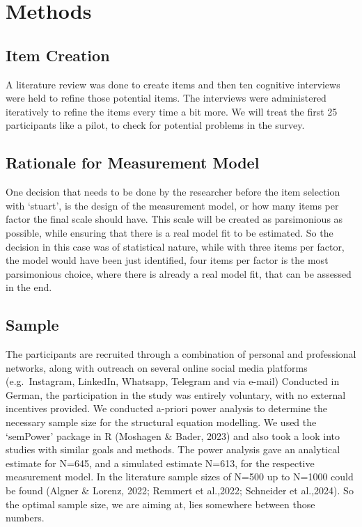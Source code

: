 \documentclass[
  12pt,
  a4paper,
  twoside]{article}
\begin{document}
\section{Methods}\label{methods}

\subsection{Item Creation}\label{item-creation}

A literature review was done to create items and then ten cognitive interviews were held to refine those potential items. The interviews were administered iteratively to refine the items every time a bit more. We will treat the first 25 participants like a pilot, to check for potential problems in the survey.

\subsection{Rationale for Measurement Model}\label{rationale-for-measurement-model}

One decision that needs to be done by the researcher before the item selection with `stuart', is the design of the measurement model, or how many items per factor the final scale should have.
This scale will be created as parsimonious as possible, while ensuring that there is a real model fit to be estimated. So the decision in this case was of statistical nature, while with three items per factor, the model would have been just identified, four items per factor is the most parsimonious choice, where there is already a real model fit, that can be assessed in the end.

\subsection{Sample}\label{sample}

The participants are recruited through a combination of personal and professional networks, along with outreach on several online social media platforms (e.g.~Instagram, LinkedIn, Whatsapp, Telegram and via e-mail) Conducted in German, the participation in the study was entirely voluntary, with no external incentives provided. We conducted a-priori power analysis to determine the necessary sample size for the structural equation modelling. We used the `semPower' package in R (Moshagen \& Bader, 2023) and also took a look into studies with similar goals and methods. The power analysis gave an analytical estimate for N=645, and a simulated estimate N=613, for the respective measurement model. In the literature sample sizes of N=500 up to N=1000 could be found (Algner \& Lorenz, 2022; Remmert et al.,2022; Schneider et al.,2024). So the optimal sample size, we are aiming at, lies somewhere between those numbers.
\end{document}
